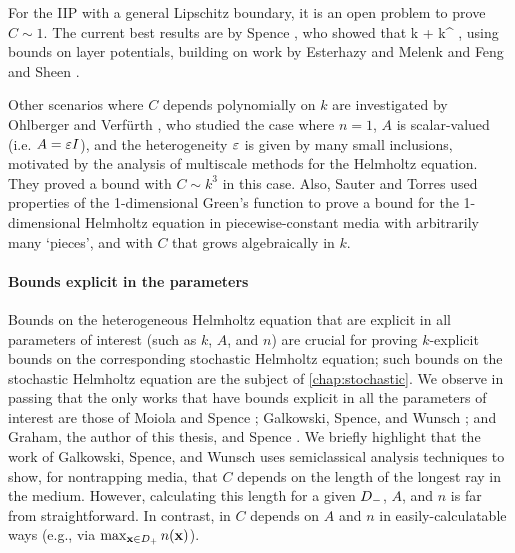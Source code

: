 For the IIP with a general Lipschitz boundary, it is an open problem to prove $C \sim 1.$ The current best results are by Spence \cite{Sp:14}, who showed that
\beqs
{} \lesssim k  + k^{\half} \NLtGI{\gI},
\eeqs
using bounds on layer potentials, building on work by Esterhazy and Melenk \cite{EsMe:12} and Feng and Sheen \cite{FeSh:94}.


Other scenarios where $C$ depends polynomially on $k$ are investigated by Ohlberger and Verf\"urth \cite{OhVe:18}, who studied the case where $n=1$, $A$ is scalar-valued (i.e. $A = \varepsilon I$), and the heterogeneity $\varepsilon$ is given by many small inclusions, motivated by the analysis of multiscale methods for the Helmholtz equation. They proved a bound with $C \sim k^3$ in this case.  Also, Sauter and Torres \cite{SaTo:18} used properties of the 1-dimensional Green's function to prove a bound for the 1-dimensional Helmholtz equation in piecewise-constant media with arbitrarily many `pieces', and with $C$ that grows algebraically in $k$.






\paragraph{Bounds explicit in the parameters} Bounds on the heterogeneous Helmholtz equation that are explicit in all parameters of interest (such as $k$, $A$, and $n$) are crucial for proving $k$-explicit bounds on the corresponding stochastic Helmholtz equation; such bounds on the stochastic Helmholtz equation are the subject of \cref{chap:stochastic}. We observe in passing that the only works that have bounds explicit in all the parameters of interest are those of Moiola and Spence \cite{MoSp:19}; Galkowski, Spence, and Wunsch \cite{GaSpWu:18}; and Graham, the author of this thesis, and Spence \cite{GrPeSp:19}. We briefly highlight that the work of Galkowski, Spence, and Wunsch uses semiclassical analysis techniques to show, for nontrapping media, that $C$ depends on the length of the longest ray in the medium. However, calculating this length for a given $D_{-}$, $A$, and $n$ is far from straightforward. In contrast, in \cite{MoSp:19,GrPeSp:19} $C$ depends on $A$ and $n$ in easily-calculatable ways (e.g., via $\max_{\mathbf{x} \in D_{+}} n(\mathbf{x})$).

